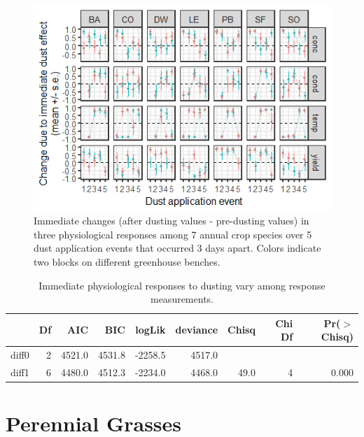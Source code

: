 \documentclass[]{scrartcl}
\begin{document}
\begin{figure}[!h]
\centering
\includegraphics{figures/diff_gg-1.png}
\caption{Immediate changes (after dusting values - pre-dusting values)
in three physiological responses among 7 annual crop species over 5 dust
application events that occurred 3 days apart. Colors indicate two
blocks on different greenhouse benches.}
\end{figure}

\begin{table}[ht]
\centering
\begin{tabular}{lrrrrrrrr}
  \hline
 & Df & AIC & BIC & logLik & deviance & Chisq & Chi Df & Pr($>$Chisq) \\ 
  \hline
diff0 & 2 & 4521.0 & 4531.8 & -2258.5 & 4517.0 &  &  &  \\ 
  diff1 & 6 & 4480.0 & 4512.3 & -2234.0 & 4468.0 & 49.0 & 4 & 0.000 \\ 
   \hline
\end{tabular}
\caption{Immediate physiological responses to dusting vary among response measurements.} 
\end{table}

\clearpage

\hypertarget{perennial-grasses}{%
\section{Perennial Grasses}\label{perennial-grasses}}
\end{document}
